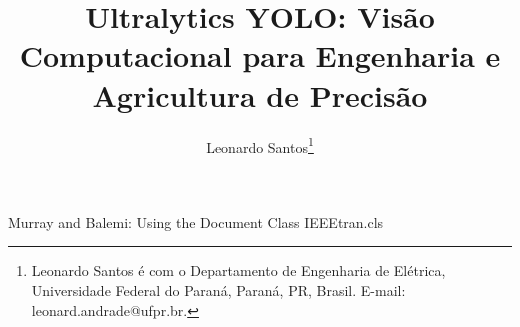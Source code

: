 \documentclass[journal,transmag]{IEEEtran}
\begin{document}
\title{Ultralytics YOLO: Visão Computacional para Engenharia e Agricultura de Precisão} %

\author{Leonardo Santos\thanks{Leonardo Santos é com o Departamento de Engenharia de Elétrica, Universidade Federal do Paraná, Paraná, PR, Brasil. E-mail: leonard.andrade@ufpr.br.}}

{Murray and Balemi: Using the Document Class IEEEtran.cls} %


\maketitle
\end{document}
